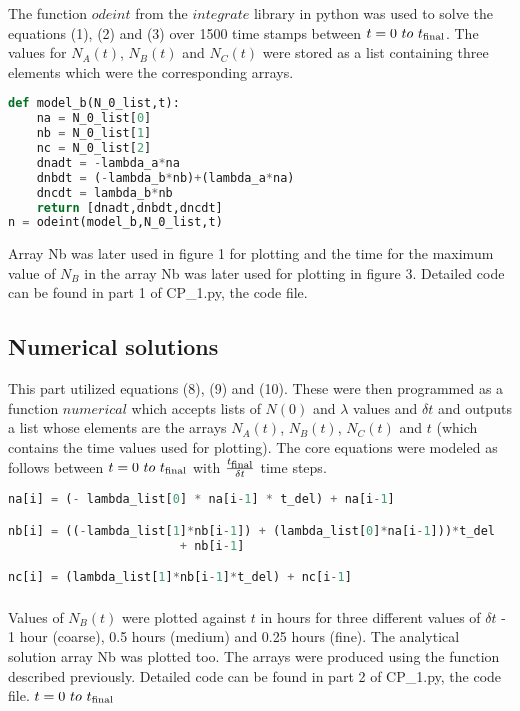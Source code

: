 \documentclass[11pt, oneside]{article}   	%
\begin{document}
The function $odeint$ from the $integrate$ library in python was used to solve the equations (1), (2) and (3) over 1500 time stamps between $t = 0\ to\ t\textsubscript{final}$. The values for $N_A(t)$, $N_B(t)$ and $N_C(t)$ were stored as a list containing three elements which were the corresponding arrays. 


\begin{lstlisting}[language = python]
def model_b(N_0_list,t):
	na = N_0_list[0]
	nb = N_0_list[1]
	nc = N_0_list[2]
	dnadt = -lambda_a*na
	dnbdt = (-lambda_b*nb)+(lambda_a*na)
	dncdt = lambda_b*nb
	return [dnadt,dnbdt,dncdt]
n = odeint(model_b,N_0_list,t)
\end{lstlisting}

Array Nb was later used in figure 1 for plotting and the time for the maximum value of $N_B$ in the array Nb was later used for plotting in figure 3. Detailed code can be found in part 1 of CP\_1.py, the code file. 


\subsection{Numerical solutions}
This part utilized equations (8), (9) and (10). These were then programmed as a function $numerical$ which accepts lists of $N(0)$ and $\lambda$ values and $\delta t$ and outputs a list whose elements are the arrays $N_A(t)$, $N_B(t)$, $N_C(t)$ and $t$ (which contains the time values used for plotting). The core equations were modeled as follows between $t = 0\ to\ t\textsubscript{final}$  with $\frac{t\textsubscript{final}}{\delta t}$ time steps.

\begin{lstlisting}[language = python]
na[i] = (- lambda_list[0] * na[i-1] * t_del) + na[i-1]

nb[i] = ((-lambda_list[1]*nb[i-1]) + (lambda_list[0]*na[i-1]))*t_del 
						+ nb[i-1]

nc[i] = (lambda_list[1]*nb[i-1]*t_del) + nc[i-1]
\end{lstlisting}


\subsubsection{} 
Values of $N_B(t)$ were plotted against $t $ in hours for three different values of $\delta t$ - 1 hour (coarse), 0.5 hours (medium) and 0.25 hours (fine). The analytical solution array Nb was plotted too. The arrays were produced using the function described previously. Detailed code can be found in part 2 of CP\_1.py, the code file. $t = 0\ to\ t\textsubscript{final}$
\end{document}

